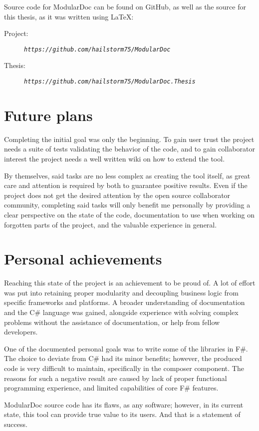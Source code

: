 Source code for ModularDoc can be found on GitHub, as well as the source for this thesis, as it was written using \LaTeX:
\begin{description}
    \item[Project:] \textit{\nolinkurl{https://github.com/hailstorm75/ModularDoc}}
    \item[Thesis:] \textit{\nolinkurl{https://github.com/hailstorm75/ModularDoc.Thesis}}
\end{description}

\section*{Future plans}

Completing the initial goal was only the beginning. To gain user trust the project needs a suite of tests validating the behavior of the code, and to gain collaborator interest the project needs a well written wiki on how to extend the tool.

By themselves, said tasks are no less complex as creating the tool itself, as great care and attention is required by both to guarantee positive results. Even if the project does not get the desired attention by the open source collaborator community, completing said tasks will only benefit me personally by providing a clear perspective on the state of the code, documentation to use when working on forgotten parts of the project, and the valuable experience in general.

\section*{Personal achievements}

Reaching this state of the project is an achievement to be proud of. A lot of effort was put into retaining proper modularity and decoupling business logic from specific frameworks and platforms. A broader understanding of documentation and the C\# language was gained, alongside experience with solving complex problems without the assistance of documentation, or help from fellow developers.

One of the documented personal goals was to write some of the libraries in F\#. The choice to deviate from C\# had its minor benefits; however, the produced code is very difficult to maintain, specifically in the composer component. The reasons for such a negative result are caused by lack of proper functional programming experience, and limited capabilities of core F\# features.

ModularDoc source code has its flaws, as any software; however, in its current state, this tool can provide true value to its users. And that is a statement of success.